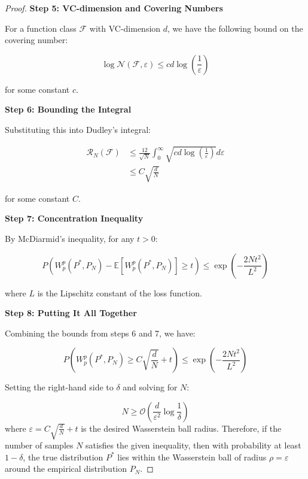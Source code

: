 \documentclass[11pt, oneside]{article}
\begin{document}
\begin{proof}
\textbf{Step 5: VC-dimension and Covering Numbers}

For a function class $\mathcal{F}$ with VC-dimension $d$, we have the following bound on the covering number:

\begin{equation}
    \log \mathcal{N}(\mathcal{F}, \varepsilon) \leq c d \log\left(\frac{1}{\varepsilon}\right)
\end{equation}

for some constant $c$.

\textbf{Step 6: Bounding the Integral}

Substituting this into Dudley's integral:

\begin{align}
    \mathcal{R}_N(\mathcal{F}) &\leq \frac{12}{\sqrt{N}} \int_0^\infty \sqrt{c d \log\left(\frac{1}{\varepsilon}\right)} d\varepsilon \\
    &\leq C\sqrt{\frac{d}{N}}
\end{align}

for some constant $C$.

\textbf{Step 7: Concentration Inequality}

By McDiarmid's inequality, for any $t > 0$:

\begin{equation}
    P(W_p^p(P^*, P_N) - \mathbb{E}[W_p^p(P^*, P_N)] \geq t) \leq \exp\left(-\frac{2Nt^2}{L^2}\right)
\end{equation}

where $L$ is the Lipschitz constant of the loss function.

\textbf{Step 8: Putting It All Together}

Combining the bounds from steps 6 and 7, we have:

\begin{equation}
    P(W_p^p(P^*, P_N) \geq C\sqrt{\frac{d}{N}} + t) \leq \exp\left(-\frac{2Nt^2}{L^2}\right)
\end{equation}

Setting the right-hand side to $\delta$ and solving for $N$:

\begin{equation}
    N \geq \mathcal{O}\left(\frac{d}{\varepsilon^2}\log\frac{1}{\delta}\right)
\end{equation}
%
where $\varepsilon = C\sqrt{\frac{d}{N}} + t$ is the desired Wasserstein ball radius. Therefore, if the number of samples $N$ satisfies the given inequality, then with probability at least $1-\delta$, the true distribution $P^*$ lies within the Wasserstein ball of radius $\rho = \varepsilon$ around the empirical distribution $P_N$.
\end{proof}
\end{document}
